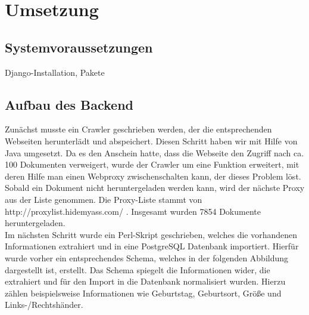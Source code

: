 \chapter{Umsetzung}
\section{Systemvoraussetzungen}
Django-Installation, Pakete

\section{Aufbau des Backend}
\label{Backend}
Zunächst musste ein Crawler geschrieben werden, der die entsprechenden Webseiten herunterlädt und abspeichert. Diesen Schritt haben wir mit Hilfe von Java umgesetzt. Da es den Anschein hatte, dass die Webseite den Zugriff nach ca. 100 Dokumenten verweigert, wurde der Crawler um eine Funktion erweitert, mit deren Hilfe man einen Webproxy zwischenschalten kann, der dieses Problem löst. Sobald ein Dokument nicht heruntergeladen werden kann, wird der nächste Proxy aus der Liste genommen. Die Proxy-Liste stammt von http://proxylist.hidemyass.com/ \cite{HMA2015}. Insgesamt wurden 7854 Dokumente heruntergeladen.\\

Im nächsten Schritt wurde ein Perl-Skript geschrieben, welches die vorhandenen Informationen extrahiert und in eine PostgreSQL Datenbank importiert. Hierfür wurde vorher ein entsprechendes Schema, welches in der folgenden Abbildung dargestellt ist, erstellt. Das Schema spiegelt die Informationen wider, die extrahiert und für den Import in die Datenbank normalisiert wurden. Hierzu zählen beispielsweise Informationen wie Geburtstag, Geburtsort, Größe und Links-/Rechtshänder.

